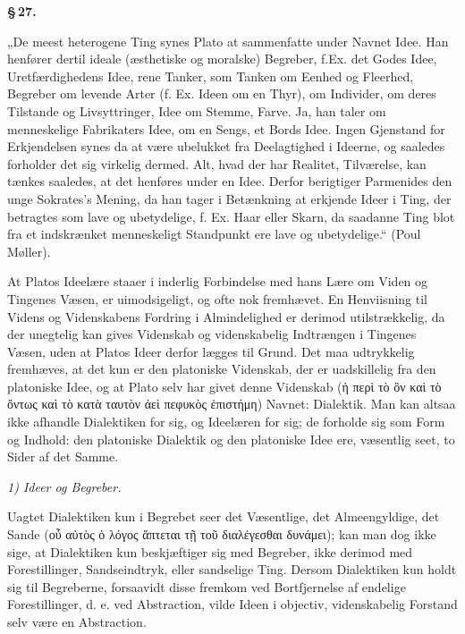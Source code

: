 \documentclass[12pt]{book}
\newcommand{\opage}[1]{\marginnote{\footnotesize\textit{[#1]}}}
\begin{document}
\begin{center}{\bfseries \S\,27.}\end{center}

„De meest heterogene Ting synes Plato at sammenfatte under Navnet Idee. Han henfører dertil
ideale (æsthetiske og moralske) Begreber, f.Ex. det Godes Idee, Uretfærdighedens Idee, rene
Tanker, som Tanken om Eenhed og Fleerhed, Begreber om levende Arter (f. Ex. Ideen om en Thyr),
om Individer, om deres Tilstande og Livsyttringer, Idee om Stemme, Farve. Ja, han taler om
menneskelige Fabrikaters Idee, om en Sengs, et Bords Idee. Ingen Gjenstand for Erkjendelsen
synes da at være ubelukket fra Deelagtighed i Ideerne, og saaledes forholder det sig virkelig
dermed. Alt, hvad der har Realitet, Tilværelse, kan tænkes saaledes, at det henføres under en
Idee. Derfor
\opage{125} berigtiger Parmenides den unge Sokrates's Mening, da han tager i Betænkning at erkjende Ideer i
Ting, der betragtes som lave og ubetydelige, f. Ex. Haar eller Skarn, da saadanne Ting blot fra
et indskrænket menneskeligt Standpunkt ere lave og ubetydelige.“ (Poul Møller).

At Platos Ideelære staaer i inderlig Forbindelse med hans Lære om Viden og Tingenes Væsen, er
uimodsigeligt, og ofte nok fremhævet. En Henviisning til Videns og Videnskabens Fordring i
Almindelighed er derimod utilstrækkelig, da der unegtelig kan gives Videnskab og videnskabelig
Indtrængen i Tingenes Væsen, uden at Platos Ideer derfor lægges til Grund. Det maa udtrykkelig
fremhæves, at det kun er den platoniske Videnskab, der er uadskillelig fra den platoniske Idee,
og at Plato selv har givet denne Videnskab (ἡ περὶ τὸ ὂν καὶ τὸ ὄντως καὶ τὸ κατὰ ταυτὸν ἀεὶ
πεφυκὸς ἐπιστήμη) Navnet: Dialektik. Man kan altsaa ikke afhandle Dialektiken for sig, og
Ideelæren for sig; de forholde sig som Form og Indhold: den platoniske Dialektik og den
platoniske Idee ere, væsentlig seet, to Sider af det Samme.

\emph{1) Ideer og Begreber.}

Uagtet Dialektiken kun i Begrebet seer det Væsentlige, det Almeengyldige, det Sande (οὗ αὐτὸς ὁ
λόγος ἅπτεται τῇ τοῦ διαλέγεσθαι δυνάμει); kan man dog ikke sige, at Dialektiken kun beskjæftiger
sig med Begreber, ikke derimod med Forestillinger, Sandseindtryk, eller sandselige Ting. Dersom
Dialektiken kun holdt sig til Begreberne, forsaavidt disse fremkom ved Bortfjernelse af endelige
Forestillinger, d. e. ved Abstraction, vilde Ideen i objectiv, videnskabelig Forstand selv være
en Abstraction.
\end{document}
